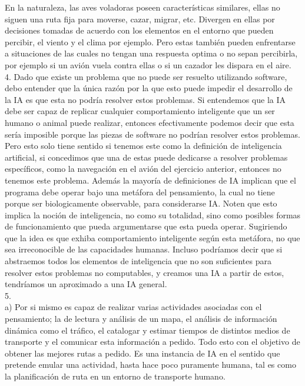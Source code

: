 En la naturaleza, las aves voladoras poseen características similares, ellas no siguen una ruta fija para moverse, cazar, migrar, etc. Divergen en ellas por decisiones tomadas de acuerdo con los elementos en el entorno que pueden percibir, el viento y el clima por ejemplo. Pero estas también pueden enfrentarse a situaciones de las cuales no tengan una respuesta optima o no sepan percibirla, por ejemplo si un avión vuela contra ellas o si un cazador les dispara en el aire. \\

4. Dado que existe un problema que no puede ser resuelto utilizando software, debo entender que la única razón por la que esto puede impedir el desarrollo de la IA es que esta no podría resolver estos problemas. Si entendemos que la IA debe ser capaz de replicar cualquier comportamiento inteligente que un ser humano o animal puede realizar, entonces efectivamente podemos decir que esta sería imposible porque las piezas de software no podrían resolver estos problemas. Pero esto solo tiene sentido si tenemos este como la definición de inteligencia artificial, si concedimos que una de estas puede dedicarse a resolver problemas específicos, como la navegación en el avión del ejercicio anterior, entonces no tenemos este problema. Además la mayoría de definiciones de IA implican que el programa debe operar bajo una metáfora del pensamiento, la cual no tiene porque ser biologicamente observable, para considerarse IA. Noten que esto implica la noción de inteligencia, no como su totalidad, sino como posibles formas de funcionamiento que pueda argumentarse que esta pueda operar. Sugiriendo que la idea es que exhiba comportamiento inteligente según esta metáfora, no que sea irreconocible de las capacidades humanas. Incluso podríamos decir que si abstraemos todos los elementos de inteligencia que no son suficientes para resolver estos problemas no computables, y creamos una IA a partir de estos, tendríamos un aproximado a una IA general. \\

5. \\

a) Por si mismo es capaz de realizar varias actividades asociadas con el pensamiento; la de lectura y análisis de un mapa, el análisis de información dinámica como el tráfico, el catalogar y estimar tiempos de distintos medios de transporte y el comunicar esta información a pedido. Todo esto con el objetivo de obtener las mejores rutas a pedido. Es una instancia de IA en el sentido que pretende emular una actividad, hasta hace poco puramente humana, tal es como la planificación de ruta en un entorno de transporte humano. \\

